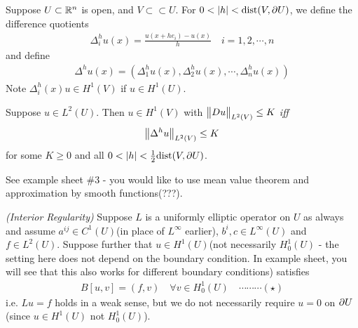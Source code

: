 \documentclass[12pt,a4paper]{report}
\newenvironment{proof}
{\begin{changemargin}{1cm}{0.5cm} 
	}%
	{\end{changemargin}
}
\begin{document}
Suppose $U\subset \mathbb{R}^n$ is open, and $V \subset \subset U$. For $0< |h| < \text{dist}(V, \partial U)$, we define the difference quotients
\begin{align*}
\Delta_i^h u(x) = \frac{u(x+ he_i) - u(x)}{h} \quad i=1,2,\cdots, n
\end{align*}
and define
\begin{align*}
\Delta^h u(x) = (\Delta_1^h u(x), \Delta_2^h u(x), \cdots, \Delta_n^h u(x))
\end{align*}
Note $\Delta_i^h(x) u \in H^1(V)$ if $u\in H^1(U)$.
\s

\lem Suppose $u \in L^2(U)$. Then $u\in H^1(V)$ with $\bigl\lVert Du\bigr\rVert_{L^2(V)} \leq K$ \emph{iff}
\begin{align*}
\bigl\lVert\Delta^h u\bigr\rVert_{L^2(V)} \leq K
\end{align*}
for some $K\geq 0$ and all $0< |h|< \frac{1}{2}\text{dist}(V, \partial U)$.
\begin{proof}
\pf See example sheet \#3 - you would like to use mean value theorem and approximation by smooth functions(???). 
\end{proof}
\s

\thm \emph{(Interior Regularity)} Suppose $L$ is a uniformly elliptic operator on $U$ as always and assume $a^{ij} \in C^1(U)$(in place of $L^{\infty}$ earlier), $b^i, c\in L^{\infty}(U)$ and $f\in L^2(U)$. Suppose further that $u \in H^1(U)$(not necessarily $H_0^1(U)$ - the setting here does not depend on the boundary condition. In example sheet, you will see that this also works for different boundary conditions) satisfies
\begin{align*}
B[u,v] = (f, v) \quad \forall v \in H_0^1(U) \quad \cdots\cdots\cdots (\star)
\end{align*}
i.e. $Lu=f$ holds in a weak sense, but we do not necessarily require $u=0$ on $\partial U$ (since $u\in H^1(U)$ not $H_0^1(U)$).
\end{document}
